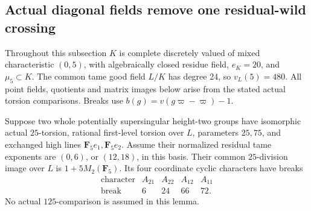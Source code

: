 \subsection{Actual diagonal fields remove one residual-wild crossing}

Throughout this subsection \(K\) is complete discretely valued of
mixed characteristic \((0,5)\), with algebraically closed residue
field, \(e_K=20\), and \(\mu_5\subset K\). The common tame good
field \(L/K\) has degree 24, so \(v_L(5)=480\). All point fields,
quotients and matrix images below arise from the stated actual
torsion comparisons. Breaks use \(b(g)=v(g\varpi-\varpi)-1\).

\begin{lemma}
\label{lem:B-RD92-tame25}
Suppose two whole potentially supersingular height-two groups have
isomorphic actual \(25\)-torsion, rational first-level torsion over
\(L\), parameters \(25,75\), and exchanged high lines
\(\mathbf F_5e_1,\mathbf F_5e_2\). Assume their normalized residual
tame exponents are \((0,6)\), or \((12,18)\), in this basis.
Their common \(25\)-division image over \(L\) is
\(1+5M_2(\mathbf F_5)\). Its four coordinate cyclic characters
have breaks
\[
 \begin{array}{c|rrrr}
 \text{character}&A_{21}&A_{22}&A_{12}&A_{11}\\\hline
 \text{break}&6&24&66&72.
 \end{array}                                           \tag{B-RD92.1}
\]
No actual \(125\)-comparison is assumed in this lemma.
\end{lemma}
